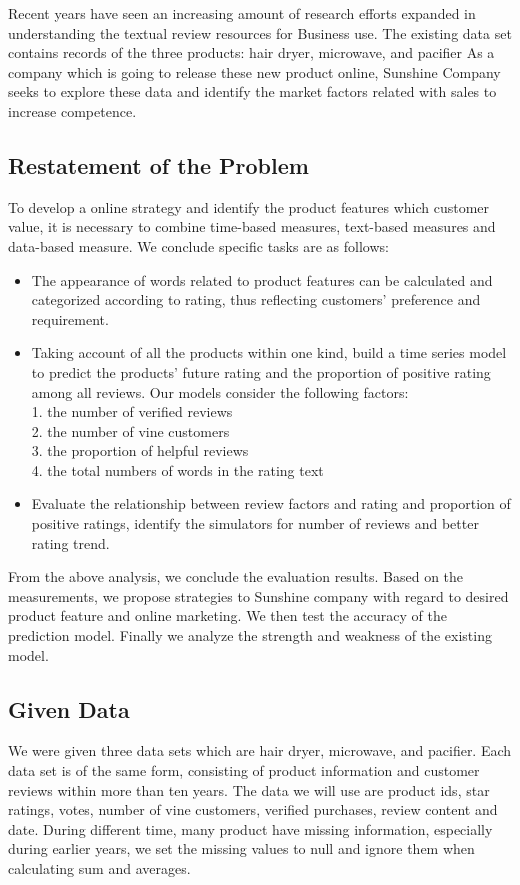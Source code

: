\documentclass[12pt]{article}
\begin{document}
Recent years have seen an increasing amount of research
efforts expanded in understanding the textual review resources for Business use. The existing data set contains records of the three products: hair dryer, microwave, and pacifier As a company which is going to release these new product online, Sunshine Company seeks to explore these data and identify the market factors related with sales to increase competence. 

\subsection{Restatement of the Problem}
To develop a online strategy and identify the product features which customer value, it is necessary to combine time-based measures, text-based measures and data-based measure. We conclude specific tasks are as follows:
\begin{itemize}
	\item The appearance of words related to product features can be calculated and categorized according to rating, thus reflecting customers' preference and requirement. 
	\item Taking account of all the products within one kind, build a time series model to predict the products' future rating and the proportion of positive rating among all reviews. Our models consider the following factors: \\
	1. the number of verified reviews \\
	2. the number of vine customers\\
	3. the proportion of helpful reviews\\
	4. the total numbers of words in the rating text
	\item Evaluate the relationship between review factors and rating and proportion of positive ratings, identify the simulators for number of reviews and better rating trend. 
\end{itemize}
From the above analysis, we conclude the evaluation results. Based on the measurements, we propose strategies to Sunshine company with regard to desired product feature and online marketing. We then test the accuracy of the prediction model. Finally we analyze the strength and weakness of the existing model. 

\subsection{Given Data}
We were given three data sets which are hair dryer, microwave, and pacifier. Each data set is of the same form, consisting of product information and customer reviews within more than ten years. The data we will use are product ids, star ratings, votes, number of vine customers, verified purchases, review content and date.
During different time, many product have missing information, especially during earlier years, we set the missing values to null and ignore them when calculating sum and averages. 
\end{document}
